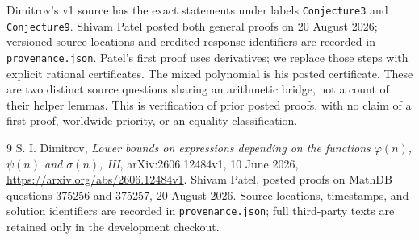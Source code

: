 \documentclass[11pt]{article}
\begin{document}
Dimitrov's v1 source has the exact statements under labels
\nolinkurl{Conjecture3} and \nolinkurl{Conjecture9}.
Shivam Patel posted both general proofs on 20 August 2026; versioned source locations and credited response identifiers are recorded in \nolinkurl{provenance.json}.
Patel's first proof uses derivatives; we replace those steps with explicit
rational certificates. The mixed polynomial is his posted certificate.
These are two distinct source questions sharing an arithmetic bridge,
not a count of their helper lemmas. This is verification of prior posted
proofs, with no claim of a first proof, worldwide priority, or an equality
classification.

\begin{thebibliography}{9}
S. I. Dimitrov, \emph{Lower bounds on expressions depending on the
functions $\varphi(n)$, $\psi(n)$ and $\sigma(n)$, III},
arXiv:2606.12484v1, 10 June 2026,
\url{https://arxiv.org/abs/2606.12484v1}.
Shivam Patel, posted proofs on MathDB questions 375256 and 375257,
20 August 2026. Source locations, timestamps, and solution identifiers are recorded in \nolinkurl{provenance.json}; full third-party texts are retained only in the development checkout.
\end{thebibliography}
\end{document}
